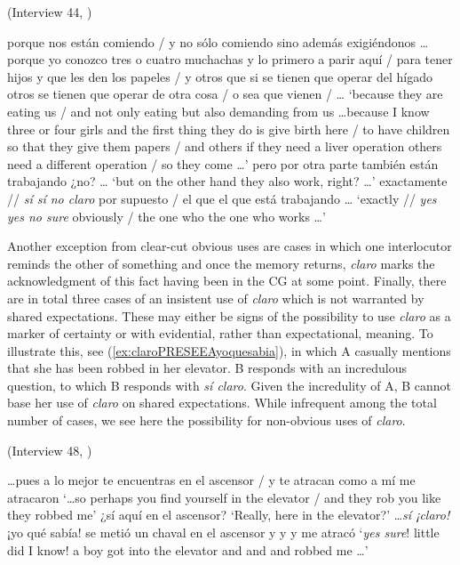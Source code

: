 \begin{exe} 
	\ex \label{ex:claroPRESEEAno} (Interview 44, \cite{PRESEEA.20142020})
	\begin{xlist}[A:]
	 porque nos están comiendo / y no sólo comiendo sino además exigiéndonos \ldots porque yo conozco tres o cuatro muchachas y lo primero a parir aquí / para tener hijos y que les den los papeles / y otros que si se tienen que operar del hígado otros se tienen que operar de otra cosa / o sea que vienen / \ldots 
	\glt `because they are eating us / and not only eating but also demanding from us \ldots because I know three or four girls and the first thing they do is give birth here / to have children so that they give them papers / and others if they need a liver operation others need a different operation / so they come \ldots' 
	\exi{}{\ldots}
	pero por otra parte también están trabajando ¿no? \ldots 
	\glt `but on the other hand they also work, right? \ldots'
	 exactamente // \textit{sí sí no claro} por supuesto / el que el que está trabajando \ldots 
	\glt `exactly // \textit{yes yes no sure} obviously / the one who the one who works \ldots'
	\end{xlist}
\end{exe}

Another exception from clear-cut obvious uses are cases in which one interlocutor reminds the other of something and once the memory returns, \textit{claro} marks the acknowledgment of this fact having been in the \ac{CG} at some point. Finally, there are in total three cases of an insistent use of \textit{claro} which is not warranted by shared expectations. These may either be signs of the possibility to use \textit{claro} as a marker of certainty or with evidential, rather than expectational, meaning. To illustrate this, see (\ref{ex:claroPRESEEAyoquesabia}), in which A casually mentions that she has been robbed in her elevator. B responds with an incredulous question, to which B responds with \textit{sí claro}. Given the incredulity of A, B cannot base her use of \textit{claro} on shared expectations. While infrequent among the total number of cases, we see here the possibility for non-obvious uses of \textit{claro}.


\begin{exe} 
\ex \label{ex:claroPRESEEAyoquesabia}(Interview 48, \cite{PRESEEA.20142020})
	\begin{xlist}[A:]
	 \ldots pues a lo mejor te encuentras en el ascensor / y te atracan como a mí me atracaron
	\glt `\ldots so perhaps you find yourself in the elevator / and they rob you like they robbed me'
	¿sí aquí en el ascensor?
	\glt `Really, here in the elevator?'
	 \ldots \textit{sí ¡claro!} ¡yo qué sabía! se metió un chaval en el ascensor y y y me atracó
	\glt `\textit{yes sure}! little did I know! a boy got into the elevator and and and robbed me \ldots'
	\end{xlist}
\end{exe}

